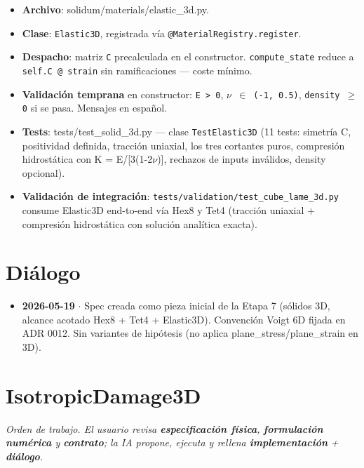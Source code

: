 \documentclass[11pt,letterpaper,oneside]{report}
\begin{document}
\begin{itemize}
  \item \textbf{Archivo}: solidum/materials/elastic\_3d.py.
  \item \textbf{Clase}: \texttt{Elastic3D}, registrada vía \texttt{@MaterialRegistry.register}.
  \item \textbf{Despacho}: matriz \texttt{C} precalculada en el constructor. \texttt{compute\_state} reduce a \texttt{self.C @ strain} sin ramificaciones --- coste mínimo.
  \item \textbf{Validación temprana} en constructor: \texttt{E > 0}, \texttt{\ensuremath{\nu} \ensuremath{\in} (-1, 0.5)}, \texttt{density \ensuremath{\ge} 0} si se pasa. Mensajes en español.
  \item \textbf{Tests}: tests/test\_solid\_3d.py --- clase \texttt{TestElastic3D} (11 tests: simetría C, positividad definida, tracción uniaxial, los tres cortantes puros, compresión hidrostática con K = E/[3(1-2\ensuremath{\nu})], rechazos de inputs inválidos, density opcional).
  \item \textbf{Validación de integración}: \texttt{tests/validation/test\_cube\_lame\_3d.py} consume Elastic3D end-to-end vía Hex8 y Tet4 (tracción uniaxial + compresión hidrostática con solución analítica exacta).
\end{itemize}


\section{Diálogo}

\begin{itemize}
  \item \textbf{2026-05-19} \ensuremath{\cdot} Spec creada como pieza inicial de la Etapa 7 (sólidos 3D, alcance acotado Hex8 + Tet4 + Elastic3D). Convención Voigt 6D fijada en ADR 0012. Sin variantes de hipótesis (no aplica plane\_stress/plane\_strain en 3D).
\end{itemize}


\newpage

\section{IsotropicDamage3D}



\textit{Orden de trabajo. El usuario revisa \textbf{especificación física}, \textbf{formulación numérica} y \textbf{contrato}; la IA propone, ejecuta y rellena \textbf{implementación} + \textbf{diálogo}.}
\end{document}
